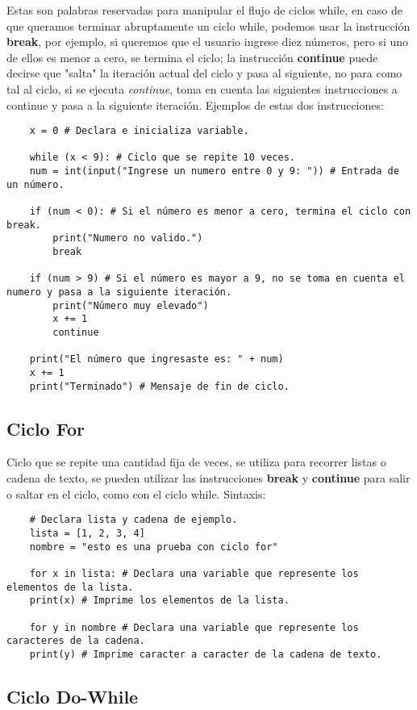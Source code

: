 Estas son palabras reservadas para manipular el flujo de ciclos while, en caso de que queramos terminar abruptamente un ciclo while, podemos usar la instrucción \textbf{break}, por ejemplo, si queremos que el usuario ingrese diez números, pero si uno de ellos es menor a cero, se termina el ciclo; la instrucción \textbf{continue} puede decirse que "salta" la iteración actual del ciclo y pasa al siguiente, no para como tal al ciclo, si se ejecuta \textit{continue}, toma en cuenta las siguientes instrucciones a continue y pasa a la siguiente iteración. Ejemplos de estas dos instrucciones:
\begin{lstlisting}
    x = 0 # Declara e inicializa variable.

    while (x < 9): # Ciclo que se repite 10 veces.
	num = int(input("Ingrese un numero entre 0 y 9: ")) # Entrada de un número.

	if (num < 0): # Si el número es menor a cero, termina el ciclo con break.
		print("Numero no valido.")
		break

	if (num > 9) # Si el número es mayor a 9, no se toma en cuenta el numero y pasa a la siguiente iteración.
		print("Número muy elevado")
		x += 1
		continue

	print("El número que ingresaste es: " + num)
	x += 1
    print("Terminado") # Mensaje de fin de ciclo.
\end{lstlisting}


\subsection{Ciclo For}

Ciclo que se repite una cantidad fija de veces, se utiliza para recorrer listas o cadena de texto, se pueden utilizar las instrucciones \textbf{break} y \textbf{continue} para salir o saltar en el ciclo, como con el ciclo while. Sintaxis:
\begin{lstlisting}
    # Declara lista y cadena de ejemplo.
    lista = [1, 2, 3, 4]
    nombre = "esto es una prueba con ciclo for"

    for x in lista: # Declara una variable que represente los elementos de la lista.
	print(x) # Imprime los elementos de la lista.

    for y in nombre # Declara una variable que represente los caracteres de la cadena.
	print(y) # Imprime caracter a caracter de la cadena de texto.
\end{lstlisting}


\subsection{Ciclo Do-While}

